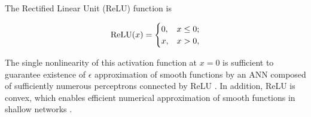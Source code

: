 \begin{definition}{The Rectified Linear Unit (ReLU) function is}
\label{relu}

  \[\text{ReLU}(x) = \begin{cases} 0, & x \leq 0;\\
      x, & x > 0,\end{cases}\]
\end{definition}


The single nonlinearity of this activation function
at $x = 0$ is sufficient to guarantee existence of $\epsilon$ approximation of smooth functions by an ANN composed of sufficiently numerous perceptrons connected by ReLU \cite{petersen2018optimal}. In addition, ReLU is convex, which enables efficient numerical approximation of smooth functions in shallow networks  \cite{li2017convergence}.  







